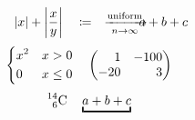 \documentclass{article}
\DeclarePairedDelimiter{\abs}{\lvert}{\rvert}
\begin{document}
\[\abs{x}+\abs*{\frac{x}{y}}\quad\coloneqq\quad\xrightarrow[n\to\infty]{\text{uniform}}\quad\mathclap{a+b+c}\]
\[\begin{dcases}x^2&x>0\\0&x\le0\end{dcases}\quad\begin{pmatrix*}[r]1&-100\\-20&3\end{pmatrix*}\]
\[\prescript{14}{6}{\mathrm C}\quad\underbracket{a+b+c}\]
\end{document}
